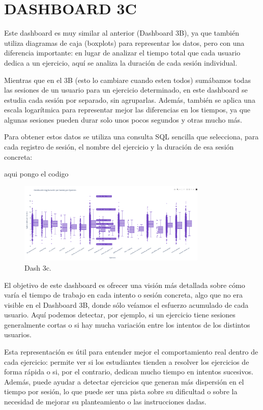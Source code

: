 \documentclass[a4paper, 12pt]{book}
\begin{document}
\section{DASHBOARD 3C}

Este dashboard es muy similar al anterior (Dashboard 3B), ya que también utiliza diagramas de caja (boxplots) para representar los datos, pero con una diferencia importante: en lugar de analizar el tiempo total que cada usuario dedica a un ejercicio, aquí se analiza la duración de cada sesión individual.

Mientras que en el 3B (esto lo cambiare cuando esten todos) sumábamos todas las sesiones de un usuario para un ejercicio determinado, en este dashboard se estudia cada sesión por separado, sin agruparlas. Además, también se aplica una escala logarítmica para representar mejor las diferencias en los tiempos, ya que algunas sesiones pueden durar solo unos pocos segundos y otras mucho más.

Para obtener estos datos se utiliza una consulta SQL sencilla que selecciona, para cada registro de sesión, el nombre del ejercicio y la duración de esa sesión concreta:

aqui pongo el codigo

\begin{figure}
  \centering
  \includegraphics[width=9cm, keepaspectratio]{img/3c.png}
  \caption{Dash 3c.}\label{fig:3c}
\end{figure}

El objetivo de este dashboard es ofrecer una visión más detallada sobre cómo varía el tiempo de trabajo en cada intento o sesión concreta, algo que no era visible en el Dashboard 3B, donde sólo veíamos el esfuerzo acumulado de cada usuario. Aquí podemos detectar, por ejemplo, si un ejercicio tiene sesiones generalmente cortas o si hay mucha variación entre los intentos de los distintos usuarios.

Esta representación es útil para entender mejor el comportamiento real dentro de cada ejercicio: permite ver si los estudiantes tienden a resolver los ejercicios de forma rápida o si, por el contrario, dedican mucho tiempo en intentos sucesivos. Además, puede ayudar a detectar ejercicios que generan más dispersión en el tiempo por sesión, lo que puede ser una pista sobre su dificultad o sobre la necesidad de mejorar su planteamiento o las instrucciones dadas.
\end{document}
